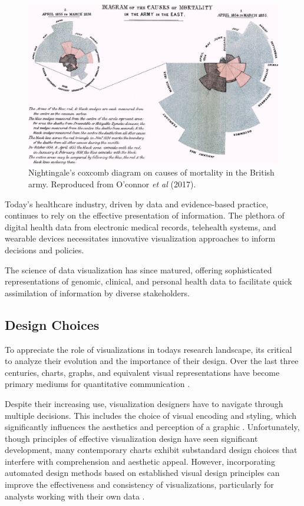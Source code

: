 \begin{figure}[ht]
  \centering
  \includegraphics[width=\textwidth]{media/fig20.jpeg}
  \caption{Nightingale's coxcomb diagram on causes of mortality in the British army. Reproduced from O'connor \textit{et al} (2017)\cite{soa7}.}
  \label{fig:vsc}
\end{figure}

Today's healthcare industry, driven by data and evidence-based practice, continues to rely on the effective presentation of information. The plethora of digital health data from electronic medical records, telehealth systems, and wearable devices necessitates innovative visualization approaches to inform decisions and policies.

The science of data visualization has since matured, offering sophisticated representations of genomic, clinical, and personal health data to facilitate quick assimilation of information by diverse stakeholders.

\subsection{Design Choices}\label{design-choices}

To appreciate the role of visualizations in today\textquotesingle s
research landscape, it\textquotesingle s critical to analyze their
evolution and the importance of their design. Over the last three
centuries, charts, graphs, and equivalent visual representations have
become primary mediums for quantitative communication
\cite{6}.

Despite their increasing use, visualization designers have to navigate
through multiple decisions. This includes the choice of visual encoding
and styling, which significantly influences the aesthetics and
perception of a graphic
\cite{7}. Unfortunately,
though principles of effective visualization design have seen
significant development, many contemporary charts exhibit substandard
design choices that interfere with comprehension and aesthetic appeal.
However, incorporating automated design methods based on established
visual design principles can improve the effectiveness and consistency
of visualizations, particularly for analysts working with their own data
\cite{8}.


